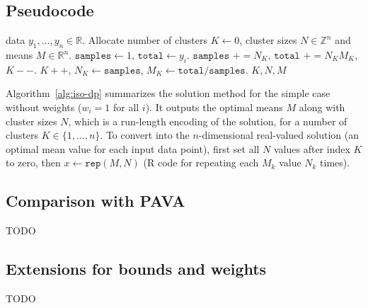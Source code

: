 \documentclass[12pt]{article}
\begin{document}
\subsection{Pseudocode}
\begin{algorithm}
\begin{algorithmic}
  \Require data $y_1,\dots, y_n\in\mathbb R$.
  \State Allocate number of clusters $K\gets 0$, cluster sizes $N\in\mathbb Z^n$ and means $M\in\mathbb R^n$.
    \State $\texttt{samples} \gets 1$, $\texttt{total} \gets y_i$.
      \State $\texttt{samples } += N_K$, $\texttt{total } += N_K M_K$, $K--$.
    \EndWhile
    \State $K++$, $N_K\gets\texttt{samples}$, $M_K\gets\texttt{total}/\texttt{samples}$.
  \EndFor
  \State \Return $K,N,M$
\end{algorithmic}
  \caption{\label{alg:iso-dp}Functional dynamic programming for isotonic regression}
\end{algorithm}

Algorithm~\ref{alg:iso-dp} summarizes the solution method for the simple case without weights ($w_i=1$ for all $i$).
It outputs the optimal means $M$ along with cluster sizes $N$, which is a run-length encoding of the solution, for a number of clusters $K\in\{1,\dots,n\}$.
To convert into the $n$-dimensional real-valued solution (an optimal mean value for each input data point), first set all $N$ values after index $K$ to zero, then $x\gets \texttt{rep}(M,N)$ (R code for repeating each $M_k$ value $N_k$ times).

\subsection{Comparison with PAVA}
TODO

\subsection{Extensions for bounds and weights}
TODO



\end{document}
